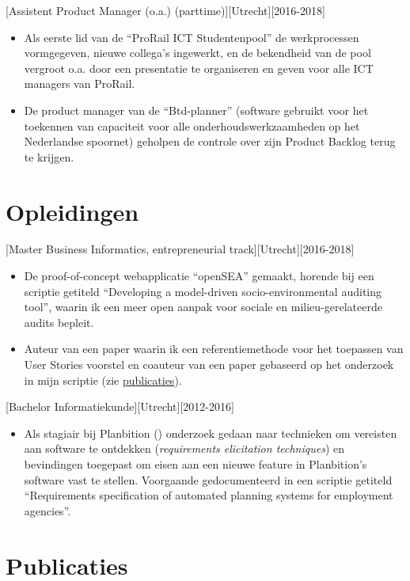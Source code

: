 \documentclass[10pt]{article}
\begin{document}
[Assistent Product Manager (o.a.) (parttime)][Utrecht][2016-2018]
\begin{itemize}
     \item Als eerste lid van de \enquote{ProRail ICT Studentenpool} de werkprocessen vormgegeven, nieuwe collega's ingewerkt, en de bekendheid van de pool vergroot o.a. door een presentatie te organiseren en geven voor alle ICT managers van ProRail.
    \item De product manager van de \enquote{Btd-planner} (software gebruikt voor het toekennen van capaciteit voor alle onderhoudswerkzaamheden op het Nederlandse spoornet) geholpen de controle over zijn Product Backlog terug te krijgen.
\end{itemize}

\section{Opleidingen}
\label{sec:school}

[Master Business Informatics, entrepreneurial track][Utrecht][2016-2018]
\begin{itemize}
    \item De proof-of-concept webapplicatie \enquote{openSEA} gemaakt, horende bij een scriptie getiteld \enquote{Developing a model-driven socio-environmental auditing tool}, waarin ik een meer open aanpak voor sociale en milieu-gerelateerde audits bepleit.
    \item Auteur van een paper waarin ik een referentiemethode voor het toepassen van User Stories voorstel en coauteur van een paper gebaseerd op het onderzoek in mijn scriptie (zie \hyperref[sec:pubs]{publicaties}).
\end{itemize}

[Bachelor Informatiekunde][Utrecht][2012-2016]
\begin{itemize}
    \item Als stagiair bij Planbition () onderzoek gedaan naar technieken om vereisten aan software te ontdekken (\textit{requirements elicitation techniques}) en bevindingen toegepast om eisen aan een nieuwe feature in Planbition's software vast te stellen. Voorgaande gedocumenteerd in een scriptie getiteld \enquote{Requirements specification of automated planning systems for employment agencies}.
\end{itemize}

\section{Publicaties}
\label{sec:pubs}
\end{document}
